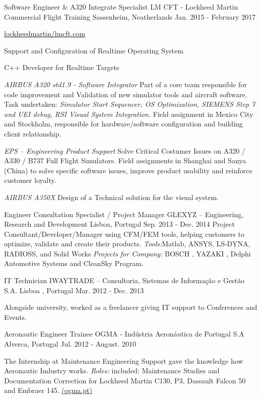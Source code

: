 \begin{cventries}
  \cventry
    {Software Engineer \& A320 Integrate Specialist}
    {LM CFT - Lockheed Martin Commercial Flight Training}
    {Sassenheim, Neatherlands}
    {Jan. 2015 - February 2017}
    {          
      \href{https://www.lockheedmartin.com/us/products/lmcft.html}{lockheedmartin/lmcft.com}
      \vspace{6mm}
      \begin{cvitems}     
      \item{Support and Configuration of Realtime Operating System}
      \item{C++ Developer for Realtime Targets }
      \item {\textit{ AIRBUS A320 std1.9 - Software Integrator} Part of a core team responsible for code improvement and Validation of new simulator tools and aircraft software. Task undertaken: \textit{Simulator Start Sequencer, OS Optimization, SIEMENS Step 7 and  UEI debug, RSI Visual System Integration.} 
      Field assignment in Mexico City and Stockholm, responsible for hardware/software configuration and building client relationship.}
    \item {\textit{EPS – Engineering Product Support} Solve Critical Costumer  Issues on A320 / A330 / B737 Full Flight Simulators. Field assignments in Shanghai and Sanya (China) to  solve specific software issues, improve product usability and reinforce customer loyalty.}
       \item {\textit{AIRBUS A350X}  Design of a Technical solution for the visual system.}
       \end{cvitems}
    }

\cventry
    {Engineer Consultation Specialist / Project Manager}
    {GLEXYZ – Engineering, Research and Development}
    {Lisboa, Portugal}
    {Sep. 2013 - Dec. 2014}
    {
Project Consultant/Developer/Manager using CFM/FEM tools, helping customers to optimize, validate and create their products. \textit{Tools:}Matlab, ANSYS, LS-DYNA, RADIOSS, and Solid Works
\textit{Projects for Company:} BOSCH , YAZAKI , Delphi Automotive Systems and CleanSky Program.
    }
    
    
  \cventry
    {IT Technician}
    {IWAYTRADE – Consultoria, Sistemas de Informação e Gestão S.A.}
    {Lisboa , Portugal}
    {Mar. 2012 - Dec. 2013}
    {
      \begin{cvitems}
        \item {Alongside university, worked as a freelancer giving IT support to Conferences and Events.        }
      \end{cvitems} 
    }
    
  \cventry
    {Aeronautic Engineer Trainee}
    {OGMA - Indústria Aeronáutica de Portugal S.A}
    {Alverca, Portugal}
    {Jul. 2012 - August. 2010}
    {
      \begin{cvitems}
        \item {The Internship at Maintenance Engineering Support gave the knowledge how Aeronautic Industry works. \textit{Roles:} included: Maintenance Studies and Documentation Correction for Lockheed Martin C130, P3, Dassault Falcon 50 and Embraer 145.    \href{http://www.ogma.pt/}{(ogma.pt)}}
      \end{cvitems}
    }
\end{cventries}

